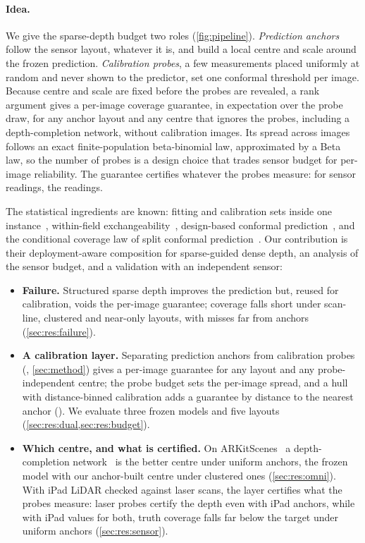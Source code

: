 \paragraph{Idea.}
We give the sparse-depth budget two roles (\cref{fig:pipeline}).
\emph{Prediction anchors} follow the sensor layout, whatever it is, and build a local centre and scale around the frozen prediction.
\emph{Calibration probes}, a few measurements placed uniformly at random and never shown to the predictor, set one conformal threshold per image.
Because centre and scale are fixed before the probes are revealed, a rank argument gives a per-image coverage guarantee, in expectation over the probe draw, for any anchor layout and any centre that ignores the probes, including a depth-completion network, without calibration images.
Its spread across images follows an exact finite-population beta-binomial law, approximated by a Beta law, so the number of probes is a design choice that trades sensor budget for per-image reliability.
The guarantee certifies whatever the probes measure: for sensor readings, the readings.

The statistical ingredients are known: fitting and calibration sets inside one instance~\cite{gui2023cmc}, within-field exchangeability~\cite{mao2024spatial}, design-based conformal prediction~\cite{wieczorek2023design}, and the conditional coverage law of split conformal prediction~\cite{vovk2012conditional}.
Our contribution is their deployment-aware composition for sparse-guided dense depth, an analysis of the sensor budget, and a validation with an independent sensor:
\begin{itemize}[leftmargin=*,itemsep=1pt,topsep=2pt]
\item \textbf{Failure.} Structured sparse depth improves the prediction but, reused for calibration, voids the per-image guarantee; coverage falls short under scan-line, clustered and near-only layouts, with misses far from anchors (\cref{sec:res:failure}).
\item \textbf{A calibration layer.} Separating prediction anchors from calibration probes (\mDual, \cref{sec:method}) gives a per-image guarantee for any layout and any probe-independent centre; the probe budget sets the per-image spread, and a hull with distance-binned calibration adds a guarantee by distance to the nearest anchor (\mDualBoth). We evaluate three frozen models and five layouts (\cref{sec:res:dual,sec:res:budget}).
\item \textbf{Which centre, and what is certified.} On ARKitScenes~\cite{baruch2021arkitscenes} a depth-completion network~\cite{zuo2025omnidc} is the better centre under uniform anchors, the frozen model with our anchor-built centre under clustered ones (\cref{sec:res:omni}). With iPad LiDAR checked against laser scans, the layer certifies what the probes measure: laser probes certify the depth even with iPad anchors, while with iPad values for both, truth coverage falls far below the target under uniform anchors (\cref{sec:res:sensor}).
\end{itemize}
